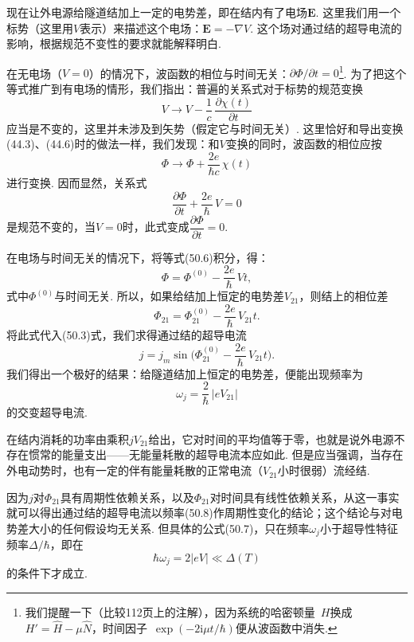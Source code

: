 现在让外电源给隧道结加上一定的电势差，即在结内有了电场$\bm{E}$. 这里我们用一个标势（这里用$V$表示）来描述这个电场：$\bm{E}=-\nabla V$. 这个场对通过结的超导电流的影响，根据规范不变性的要求就能解释明白.

在无电场（$V=0$）的情况下，波函数的相位与时间无关：$\partial\Phi/\partial t=0$\footnote{我们提醒一下（比较112页上的注解），因为系统的哈密顿量~$H$换成~$H'=\hat{H}-\mu\hat{N}$，时间因子~$\exp(-2\mathrm i\mu t/\hbar)$便从波函数中消失.}. 为了把这个等式推广到有电场的情形，我们指出：普遍的关系式对于标势的规范变换
\begin{equation}
V\to V-\frac{1}{c}\,\frac{\partial\chi(t)}{\partial t}
\end{equation}
应当是不变的，这里并未涉及到矢势（假定它与时间无关）. 这里恰好和导出变换(44.3)、(44.6)时的做法一样，我们发现：和$V$变换的同时，波函数的相位应按
\begin{equation}
\Phi\to\Phi+\frac{2e}{\hbar c}\,\chi(t)
\end{equation}
进行变换. 因而显然，关系式
\begin{equation}
\frac{\partial\Phi}{\partial t}+\frac{2e}{\hbar}\,V=0
\end{equation}
是规范不变的，当$V=0$时，此式变成$\dfrac{\partial\Phi}{\partial t}=0$.

在电场与时间无关的情况下，将等式(50.6)积分，得：
\begin{equation*}
\Phi=\Phi^{(0)}-\frac{2e}{\hbar}\,Vt,
\end{equation*}
式中$\Phi^{(0)}$与时间无关. 所以，如果给结加上恒定的电势差$V_{21}$，则结上的相位差
\begin{equation*}
\Phi_{21}=\Phi_{21}^{(0)}-\frac{2e}{\hbar}\,V_{21}t.
\end{equation*}
将此式代入(50.3)式，我们求得通过结的超导电流
\begin{equation}
j=j_m\sin\biggl(\Phi_{21}^{(0)}-\frac{2e}{\hbar}\,V_{21}t\biggr).
\end{equation}
我们得出一个极好的结果：给隧道结加上恒定的电势差，便能出现频率为
\begin{equation}
\omega_j=\frac{2}{\hbar}\,|eV_{21}|
\end{equation}
的交变超导电流.

在结内消耗的功率由乘积$jV_{21}$给出，它对时间的平均值等于零，也就是说外电源不存在惯常的能量支出——无能量耗散的超导电流本应如此. 但是应当强调，当存在外电动势时，也有一定的伴有能量耗散的正常电流（$V_{21}$小时很弱）流经结.

因为$j$对$\Phi_{21}$具有周期性依赖关系，以及$\Phi_{21}$对时间具有线性依赖关系，从这一事实就可以得出通过结的超导电流以频率(50.8)作周期性变化的结论；这个结论与对电势差大小的任何假设均无关系. 但具体的公式(50.7)，只在频率$\omega_j$小于超导性特征频率$\Delta/\hbar$，即在
\begin{equation*}
\hbar\omega_j=2|eV|\ll\Delta(T)
\end{equation*}
的条件下才成立.

